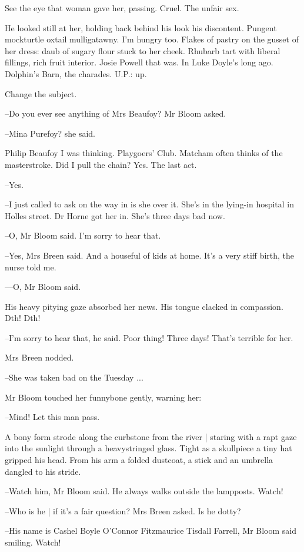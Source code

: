 See the eye that woman gave her,
passing.
Cruel.
The unfair sex.

He looked still at her,
holding back behind his look his discontent.
Pungent mockturtle oxtail mulligatawny.
I'm hungry too.
Flakes of pastry on the gusset of her dress:
daub of sugary flour stuck to her cheek.
Rhubarb tart with liberal fillings,
rich fruit interior.
Josie Powell that was.
In Luke Doyle's long ago.
Dolphin's Barn,
the charades.
U.P.:
up.

Change the subject.

--Do you ever see anything of Mrs Beaufoy?
Mr Bloom asked.

--Mina Purefoy?
she said.

Philip Beaufoy I was thinking.
Playgoers' Club.
Matcham often thinks of the masterstroke.
Did I pull the chain?
Yes.
The last act.

--Yes.

--I just called to ask on the way in is she over it.
She's in the lying-in hospital in Holles street.
Dr Horne got her in.
She's three days bad now.

--O,
Mr Bloom said.
I'm sorry to hear that.

--Yes,
Mrs Breen said.
And a houseful of kids at home.
It's a very stiff birth,
the nurse told me.

---O,
Mr Bloom said.

His heavy pitying gaze absorbed her news.
His tongue clacked in compassion.
Dth!
Dth!

--I'm sorry to hear that,
he said.
Poor thing!
Three days!
That's terrible for her.%

Mrs Breen nodded.

--She was taken bad on the Tuesday ...

Mr Bloom touched her funnybone gently,
warning her:

--Mind!
Let this man pass.

A bony form strode along the curbstone from the river |
staring with a rapt gaze into the sunlight through a heavystringed glass.
Tight as a skullpiece a tiny hat gripped his head.
From his arm a folded dustcoat,
a stick and an umbrella dangled to his stride.

--Watch him,
Mr Bloom said.
He always walks outside the lampposts.
Watch!%

--Who is he |
if it's a fair question?
Mrs Breen asked.
Is he dotty?

--His name is Cashel Boyle O'Connor Fitzmaurice Tisdall Farrell,
Mr Bloom said smiling.
Watch!


